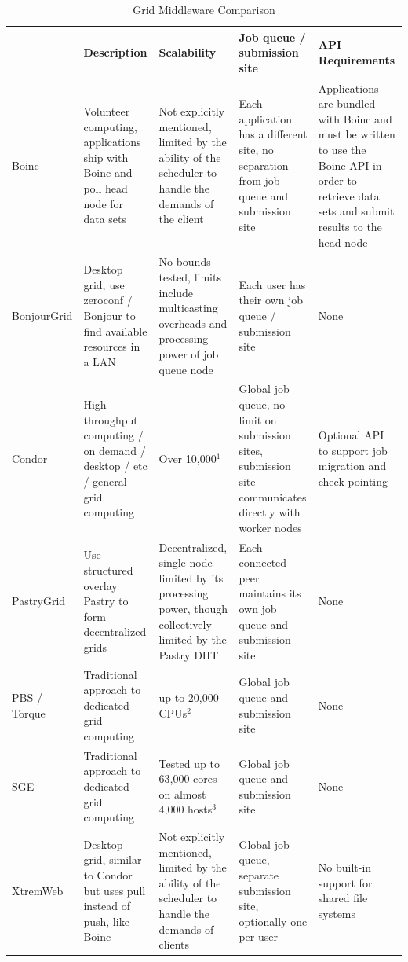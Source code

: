 \documentclass[twocolumn]{svjour3}
\begin{document}
\begin{table}[ht]
\small{
\centering
\begin{tabular}[c]{|p{1.4cm}||p{3.475cm}|p{3.475cm}|p{3.46cm}|p{3.475cm}|} \hline
& Description & Scalability & Job queue / submission site & API Requirements \\ \hline \hline
Boinc &
Volunteer computing, applications ship with Boinc and poll head node for data
sets &
Not explicitly mentioned, limited by the ability of the scheduler to handle
the demands of the client &
Each application has a different site, no separation from job queue and
submission site &
Applications are bundled with Boinc and must be written to use the Boinc API
in order to retrieve data sets and submit results to the head node
\\ \hline
BonjourGrid &
Desktop grid, use zeroconf / Bonjour to find available resources in a LAN &
No bounds tested, limits include multicasting overheads and processing power
of job queue node &
Each user has their own job queue / submission site &
None \\ \hline
Condor &
High throughput computing / on demand / desktop / etc / general grid computing &
Over 10,000$^{1}$ &
Global job queue, no limit on submission sites, submission site communicates directly with worker nodes &
Optional API to support job migration and check pointing \\ \hline
PastryGrid &
Use structured overlay Pastry to form decentralized grids &
Decentralized, single node limited by its processing power, though
collectively limited by the Pastry DHT &
Each connected peer maintains its own job queue and submission site &
None \\ \hline
PBS / Torque~\cite{torque} &
Traditional approach to dedicated grid computing &
up to 20,000 CPUs$^{2}$ &
Global job queue and submission site &
None
\\ \hline
SGE &
Traditional approach to dedicated grid computing &
Tested up to 63,000 cores on almost 4,000 hosts$^{3}$ &
Global job queue and submission site &
None
\\ \hline
XtremWeb &
Desktop grid, similar to Condor but uses pull instead of push, like Boinc &
Not explicitly mentioned, limited by the ability of the scheduler to handle
the demands of clients &
Global job queue, separate submission site, optionally one per user &
No built-in support for shared file systems
\\ \hline
\end{tabular}
\caption{Grid Middleware Comparison}
\label{tab:grid}
}
\end{table}
\end{document}
